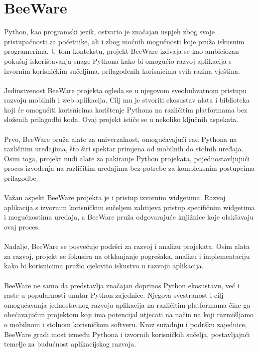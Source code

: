 	\bigskip

	\section{BeeWare}

	Python, kao programski jezik, ostvario je značajan uspjeh zbog svoje pristupačnosti za početnike, ali i zbog moćnih mogućnosti koje pruža iskusnim programerima. U tom kontekstu, projekt BeeWare izdvaja se kao ambiciozan pokušaj iskorištavanja snage Pythona kako bi omogućio razvoj aplikacija s izvornim korisničkim sučeljima, prilagođenih korisnicima svih razina vještina.
	\\ \\
	Jedinstvenost BeeWare projekta ogleda se u njegovom sveobuhvatnom pristupu razvoju mobilnih i web aplikacija. Cilj mu je stvoriti ekosustav alata i biblioteka koji će omogućiti korisnicima korištenje Pythona na različitim platformama bez složenih prilagodbi koda. Ovaj projekt ističe se u nekoliko ključnih aspekata.
	\\ \\
	Prvo, BeeWare pruža alate za univerzalnost, omogućavajući rad Pythona na različitim uređajima, što širi spektar primjena od mobilnih do stolnih uređaja. Osim toga, projekt nudi alate za pakiranje Python projekata, pojednostavljujući proces izvođenja na različitim uređajima bez potrebe za kompleksnim postupcima prilagodbe.
	\\ \\
	Važan aspekt BeeWare projekta je i pristup izvornim widgetima. Razvoj aplikacija s izvornim korisničkim sučeljem zahtijeva pristup specifičnim widgetima i mogućnostima uređaja, a BeeWare pruža odgovarajuće knjižnice koje olakšavaju ovaj proces.
	\\ \\
	Nadalje, BeeWare se posvećuje podršci za razvoj i analizu projekata. Osim alata za razvoj, projekt se fokusira na otklanjanje pogrešaka, analizu i implementaciju kako bi korisnicima pružio cjelovito iskustvo u razvoju aplikacija.
	\\ \\
	BeeWare ne samo da predstavlja značajan doprinos Python ekosustavu, već i raste u popularnosti unutar Python zajednice. Njegova svestranost i cilj omogućavanja jednostavnog razvoja aplikacija na različitim platformama čine ga obećavajućim projektom koji ima potencijal utjecati na način na koji razmišljamo o mobilnom i stolnom korisničkom softveru. Kroz suradnju i podršku zajednice, BeeWare gradi most između Pythona i izvornih korisničkih sučelja, postavljajući temelje za budućnost aplikacijskog razvoja.

